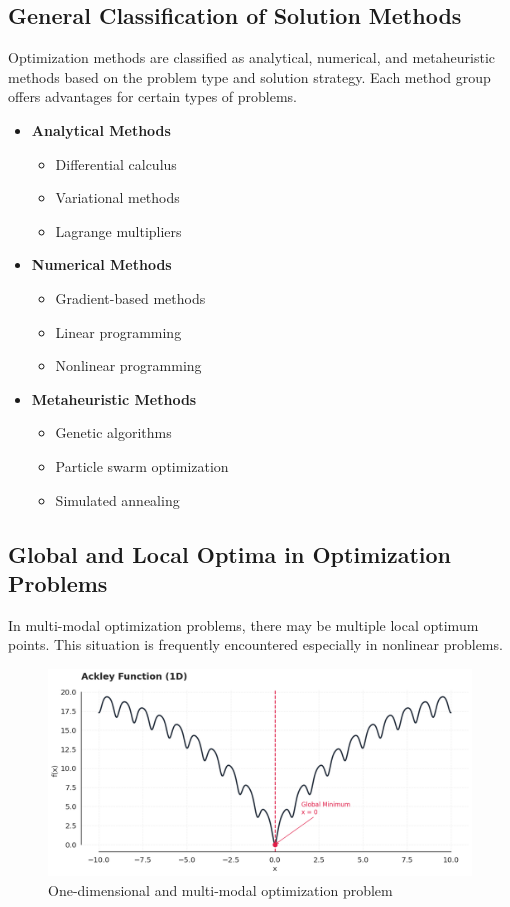 \subsection{General Classification of Solution Methods}
Optimization methods are classified as analytical, numerical, and metaheuristic methods based on the problem type and solution strategy. Each method group offers advantages for certain types of problems.

\begin{itemize}
    \item \textbf{Analytical Methods}
        \begin{itemize}
            \item Differential calculus
            \item Variational methods
            \item Lagrange multipliers
        \end{itemize}
    \item \textbf{Numerical Methods}
        \begin{itemize}
            \item Gradient-based methods
            \item Linear programming
            \item Nonlinear programming
        \end{itemize}
    \item \textbf{Metaheuristic Methods}
        \begin{itemize}
            \item Genetic algorithms
            \item Particle swarm optimization
            \item Simulated annealing
        \end{itemize}
\end{itemize}

\subsection{Global and Local Optima in Optimization Problems}

In multi-modal optimization problems, there may be multiple local optimum points. This situation is frequently encountered especially in nonlinear problems.

\begin{figure}[H]
    \centering
    \includegraphics[width=\textwidth]{weeks_new/imgs/multi_mod.png}
    \caption{One-dimensional and multi-modal optimization problem}
    \label{fig:multi_mod}
\end{figure}

